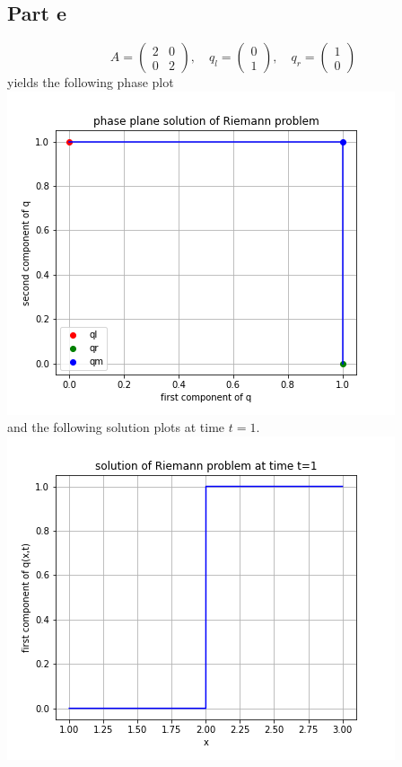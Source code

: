 \documentclass{article}
\begin{document}
\subsection{Part e}
\[
A=\begin{pmatrix}
	2&0\\0&2
\end{pmatrix},\quad q_l=\begin{pmatrix}
	0\\1
\end{pmatrix},\quad q_r=\begin{pmatrix}
	1\\0
\end{pmatrix}
\]
yields the following phase plot\\
\includegraphics[scale=0.7]{parte.png}
\\
and the following solution plots at time $t=1$.\\
\includegraphics[scale=0.7]{parte1.png}\\
\end{document}

